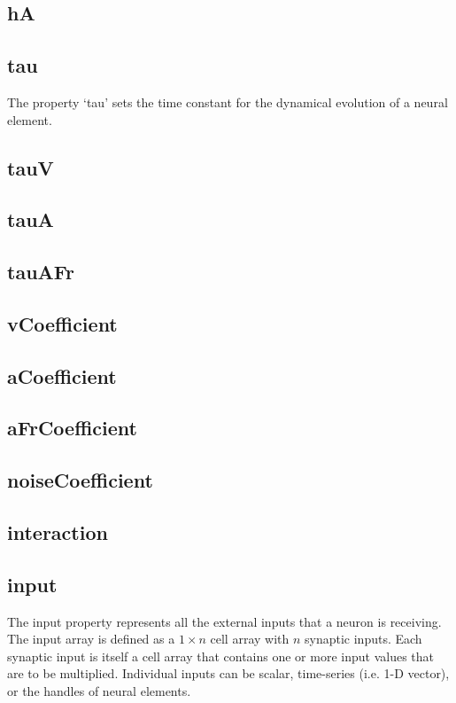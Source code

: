 \documentclass[phd, 12pt, doublespace, online]{fauthesis}
\begin{document}
\subsection{hA}

\subsection{tau}

The property `tau' sets the time constant for the dynamical evolution of a neural element. 

\subsection{tauV}
\subsection{tauA}
\subsection{tauAFr}

\subsection{vCoefficient}
\subsection{aCoefficient}
\subsection{aFrCoefficient}
\subsection{noiseCoefficient}
\subsection{interaction}
\subsection{input}

The input property represents all the external inputs that a neuron is receiving. The input array is defined as a $1 \times n$ cell array with $n$ synaptic inputs. Each synaptic input is itself a cell array that contains one or more input values that are to be multiplied. Individual inputs can be scalar, time-series (i.e. 1-D vector), or the handles of neural elements. 
\end{document}
